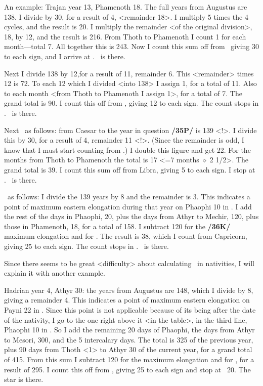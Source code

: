 An example: Trajan year 13, Phamenoth 18. The full years from Augustus are 138. I divide by 30,
for a result of 4, <remainder 18>. I multiply 5 times the 4 cycles, and the result is 20. I multiply the remainder <of the original division>, 18, by 12, and the result is 216. From Thoth to Phamenoth I count 1 for each month—total 7. All together this is 243. Now I count this sum off from \Cancer\, giving 30 to each sign, and I arrive at \Pisces. \Saturn\, is there.

Next I divide 138 by 12,for a result of 11, remainder 6. This <remainder> times 12 is 72. To each 12 which I divided <into 138> I assign 1, for a total of 11. Also to each month <from Thoth to Phamenoth I assign 1>, for a total of 7. The grand total is 90. I count this off from \Taurus, giving 12 to
each sign. The count stops in \Sagittarius. \Jupiter\, is there. 

Next \Mars\, as follows: from Caesar to the year in question \textbf{/35P/} is 139 <!>. I divide this by 30, for a
result of 4, remainder 11 <!>. (Since the remainder is odd, I know that I must start counting from \Libra.) I double this figure and get 22. For the months from Thoth to Phamenoth the total is 17 <=7 months $\diamond$ 2 1/2>. The grand total is 39. I count this sum off from Libra, giving 5 to each sign. I stop at \Taurus. \Mars\, is there.

\Venus\, as follows: I divide the 139 years by 8 and the remainder is 3. This indicates a point of maximum eastern elongation during that year on Phaophi 10 in \Sagittarius. I add the rest of the days in Phaophi, 20, plus the days from Athyr to Mechir, 120, plus those in Phamenoth, 18, for a total of 158. I subtract 120 for the \textbf{/36K/} maximum elongation and for \Sagittarius. The result is 38, which I count from Capricorn, giving 25 to each sign. The count stops in \Aquarius. \Venus\, is there.

Since there seems to be great <difficulty> about calculating \Venus\, in nativities, I will explain it with another example. 

Hadrian year 4, Athyr 30: the years from Augustus are 148, which I divide by 8, giving a remainder 4. This indicates a point of maximum eastern elongation on Payni 22 in \Leo. Since this point is not applicable because of its being after the date of the nativity, I go to the one right above it <in
the table>, in the third line, Phaophi 10 in \Sagittarius. So I add the remaining 20 days of Phaophi, the days from Athyr to Mesori, 300, and the 5 intercalary days. The total is 325 of the previous year, plus 90 days from Thoth <1> to Athyr 30 of the current year, for a grand total of 415. From this sum I subtract 120 for the maximum elongation and for \Sagittarius, for a result of 295. I count this off from \Capricorn,
giving 25 to each sign and stop at \Sagittarius\, 20. The star is there.

